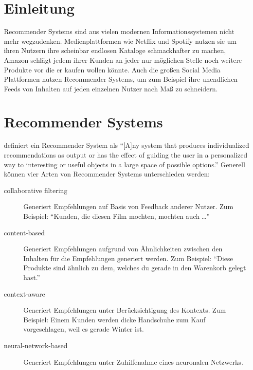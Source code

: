 
\section{Einleitung}

Recommender Systems sind aus vielen modernen Informationssystemen nicht mehr wegzudenken.
Medienplattformen wie Netflix und Spotify nutzen sie um ihren Nutzern ihre scheinbar endlosen Kataloge schmackhafter zu machen, Amazon schlägt jedem ihrer Kunden an jeder nur möglichen Stelle noch weitere Produkte vor die er kaufen wollen könnte.
Auch die großen Social Media Plattformen nutzen Recommender Systems, um zum Beispiel ihre unendlichen Feeds von Inhalten auf jeden einzelnen Nutzer nach Maß zu schneidern.

\section{Recommender Systems}

\citeauthor{burke_hybrid_2002} definiert ein Recommender System als \enquote{[A]ny system that produces individualized recommendations as output or has the effect of guiding the user in a personalized way to interesting or useful objects in a large space of possible options.} \parencite{burke_hybrid_2002}
Generell können vier Arten von Recommender Systems unterschieden werden:

\begin{description}
  \item[collaborative filtering] Generiert Empfehlungen auf Basis von Feedback anderer Nutzer. Zum Beispiel: \enquote{Kunden, die diesen Film mochten, mochten auch \ldots}
  \parencite{koren_advances_2022}
  \item[content-based] Generiert Empfehlungen aufgrund von Ähnlichkeiten zwischen den Inhalten für die Empfehlungen generiert werden. Zum Beispiel: \enquote{Diese Produkte sind ähnlich zu dem, welches du gerade in den Warenkorb gelegt hast.}
  \parencite{musto_semantics_2022}
  \item[context-aware] Generiert Empfehlungen unter Berücksichtigung des Kontexts. Zum Beispiel: Einem Kunden werden dicke Handschuhe zum Kauf vorgeschlagen, weil es gerade Winter ist.
  \parencite{adomavicius_context-aware_2022}
  \item[neural-network-based] Generiert Empfehlungen unter Zuhilfenahme eines neuronalen Netzwerks.
  \parencite{zhang_deep_2022}
\end{description}

